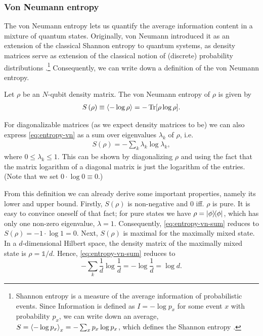 \subsubsection{Von Neumann entropy}
The von Neumann entropy lets us quantify the average information content in a mixture of
quantum states. Originally, von Neumann introduced it as an extension of the
classical Shannon entropy to quantum systems, as density matrices serve as
extension of the classical notion of (discrete) probability distributions
\cite{vonneumannMathematischeGrundlagenQuantenmechanik1968}.\footnote{Shannon
  entropy is a measure of the average information of probabilistic events.
  Since Information is defined as $I=-\log p_x$ for some event $x$ with
  probability $p_x$, we can write down an average, $S = \expval{-\log p_x}_x =
  -\sum_x p_x \log p_x$, which defines the Shannon entropy
\cite{shannonMathematicalTheoryCommunication1948}.} 
Consequently, we can write down a definition of the von Neumann entropy.
\begin{defn}\label{defn:vonneumann}
  Let $\rho$ be an $N$-qubit density matrix. The von Neumann entropy of $\rho$
  is given by
  \begin{align}\label{eq:entropy-vn}
    S\left(\rho\right) \equiv \expval{-\log \rho} = -\Tr[\rho\log\rho]
  .\end{align}
\end{defn}
For diagonalizable matrices (as we expect density matrices to be) we can also
express \cref{eq:entropy-vn} as a sum over eigenvalues $\lambda_k$ of $\rho$, i.e.
\begin{align}\label{eq:entropy-vn-sum}
  S\left(\rho\right) = -\sum_k \lambda_k \log \lambda_k
,\end{align}
where $0\leq\lambda_k\leq 1$.
This can be shown by diagonalizing $\rho$ and using the fact that the matrix
logarithm of a diagonal matrix is just the logarithm of the entries.
(Note that we set $0\cdot\log 0 \equiv 0$.)

From this definition we can already derive some important properties, namely
its lower and upper bound. Firstly, $S(\rho)$ is non-negative and $0$ iff.
$\rho$ is pure. It is easy to convince oneself of that fact; for pure states we
have $\rho = \dyad{\phi}$, which has only one non-zero eigenvalue, $\lambda =
1$. Consequently, \cref{eq:entropy-vn-sum} reduces to $S(\rho) = - 1\cdot\log 1
=0$.  Next, $S(\rho)$ is maximal for the maximally mixed state. In a
$d$-dimensional Hilbert space, the density matrix of the maximally mixed state
is $\rho = \mathds{1}/d$. Hence, \cref{eq:entropy-vn-sum} reduces to
\[
  -\sum_k \frac{1}{d} \log \frac{1}{d} = -\log \frac{1}{d} = \log d
.\]
